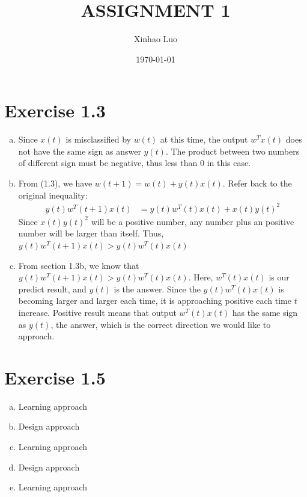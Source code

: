 \documentclass{article}
\title{\bf \Large ASSIGNMENT 1}
\author{Xinhao Luo}
\date{\today}
\def\math#1{$#1$}
\begin{document}
\maketitle
\medskip

\section{Exercise 1.3}
\begin{enumerate}[a)]
    \item Since \math{x(t)} is misclassified by \math{w(t)} at this time, the output \math{w^{T}x(t)} does not have the same sign as answer \math{y(t)}. The product between two numbers of different sign must be negative, thus less than 0 in this case.
    \item From (1.3), we have \math{w(t+1) = w(t) + y(t)x(t)}. Refer back to the original inequality: 
    \begin{equation}
        \begin{split}
            y(t)w^{T}(t + 1)x(t) &= y(t)w^{T}(t)x(t) + {x(t)y(t)}^{2}
        \end{split}
    \end{equation}
    Since \math{{x(t)y(t)}^{2}} will be a positive number, any number plus an positive number will be larger than itself. Thus, \math{y(t)w^{T}(t + 1)x(t) > y(t)w^{T}(t)x(t)}
    \item From section 1.3b, we know that \math{y(t)w^{T}(t + 1)x(t) > y(t)w^{T}(t)x(t)}. Here, \math{w^{T}(t)x(t)} is our predict result, and \math{y(t)} is the answer. Since the \math{y(t)w^{T}(t)x(t)} is becoming larger and larger each time, it is approaching positive each time \math{t} increase. Positive result means that output \math{w^{T}(t)x(t)} has the same sign as \math{y(t)}, the answer, which is the correct direction we would like to approach.
\end{enumerate}

\section{Exercise 1.5}
\begin{enumerate}[a)]
    \item Learning approach
    \item Design approach
    \item Learning approach
    \item Design approach
    \item Learning approach
\end{enumerate}
\end{document}
